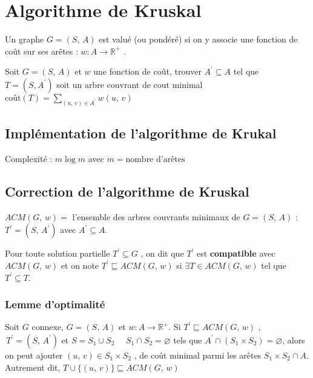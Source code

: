 \chapter{Algorithme de Kruskal}

\begin{definition}
Un graphe $G = (S,\, A)$ est valué (ou pondéré) si on y associe une fonction de coût sur ses arêtes : $w : A \longrightarrow\mathbb{R}^{+}$ .
\end{definition}

\begin{definition}
Soit $G = (S,\, A)$ et $w$ une fonction de coût, trouver $A^{\prime} \subseteq A$ tel que $T = (S, A^{\prime})$ soit un arbre couvrant de cout minimal $\text{coût}(T) = \sum\limits_{(u,\, v) \in A^{\prime}} w(u,\, v)$
\end{definition}

\section{Implémentation de l'algorithme de Krukal}



Complexité : $ m \log m $ avec $m = \text{nombre d'arêtes}$

\section{Correction de l'algorithme de Kruskal}

\begin{definition}
$ACM(G,\, w) = $ l'ensemble des arbres couvrants minimaux de $G = (S,\, A)$ : $T^{\prime} = (S,\, A^{\prime})$ avec $A^{\prime} \subseteq A$.
\end{definition}

\begin{definition}[Compatibilité]
Pour toute solution partielle $T^{\prime} \subseteq G$ , on dit que $T^{\prime}$ est \textbf{compatible} avec $ACM(G,\, w)$ et on note $T^{\prime} \sqsubseteq ACM(G,\, w)$ si $\exists T \in ACM(G,\, w)$ tel que $T^{\prime} \subseteq T$.
\end{definition}

\subsection{Lemme d'optimalité}
Soit $G$ connexe, $G = (S,\, A)$ et $w : A \longrightarrow \mathbb{R}^{+}$. Si $T^{\prime} \sqsubseteq ACM(G,\, w)$ , $\,T^{\prime} = (S,\,A^{\prime})$ et $S = S_{1} \cup S_{2}$ $\quad S_{1} \cap S_{2} = \varnothing$ tels que $A^{\prime} \cap (S_{1} \times S_{2}) = \varnothing$, alors on peut ajouter $(u,\, v) \in S_{1} \times S_{2}$ , de coût minimal parmi les arêtes $S_{1} \times S_{2} \cap A$. Autrement dit, $T \cup \lbrace (u,\, v) \rbrace \sqsubseteq ACM(G,\, w)$

